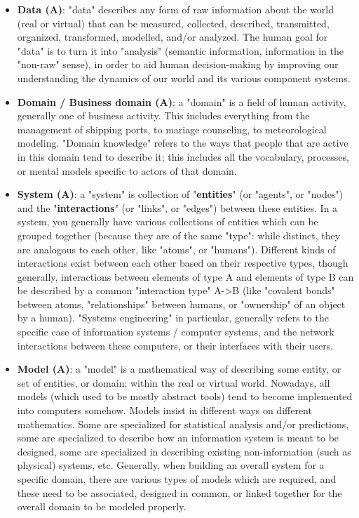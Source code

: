 \documentclass{article}
\begin{document}
\begin{itemize}
	\item \textbf{Data (A)}: "data" describes any form of raw information about the world (real or virtual) that can be measured, collected, described, transmitted, organized, transformed, modelled, and/or analyzed. The human goal for "data" is to turn it into "analysis" (semantic information, information in the "non-raw" sense), in order to aid human decision-making by improving our understanding the dynamics of our world and its various component systems.

	\item \textbf{Domain / Business domain (A)}: a "domain" is a field of human activity, generally one of business activity. This includes everything from the management of shipping ports, to mariage counseling, to meteorological modeling. "Domain knowledge" refers to the ways that people that are active in this domain tend to describe it; this includes all the vocabulary, processes, or mental models specific to actors of that domain.

	\item \textbf{System (A)}: a "system" is collection of "\textbf{entities}" (or "agents", or "nodes") and the "\textbf{interactions}" (or "links", or "edges") between these entities. In a system, you generally have various collections of entities which can be grouped together (because they are of the same "type": while distinct, they are analogous to each other, like "atoms", or "humans"). Different kinds of interactions exist between each other based on their respective types, though generally, interactions between elements of type A and elements of type B can be described by a common "interaction type" A->B (like "covalent bonds" between atoms, "relationships" between humans, or "ownership" of an object by a human). "Systems engineering" in particular, generally refers to the specific case of information systems / computer systems, and the network interactions between these computers, or their interfaces with their users.

	\item \textbf{Model (A)}: a "model" is a mathematical way of describing some entity, or set of entities, or domain; within the real or virtual world. Nowadays, all models (which used to be mostly abstract tools) tend to become implemented into computers somehow. Models insist in different ways on different mathematics. Some are specialized for statistical analysis and/or predictions, some are specialized to describe how an information system is meant to be designed, some are specialized in describing existing non-information (such as physical) systems, etc. Generally, when building an overall system for a specific domain, there are various types of models which are required, and these need to be associated, designed in common, or linked together for the overall domain to be modeled properly.


\end{itemize}
\end{document}
